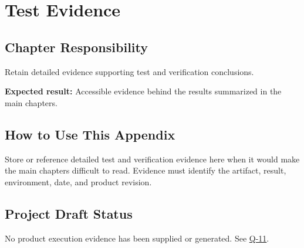 \chapter{Test Evidence}
\section{Chapter Responsibility}
\label{Section:TestEvidenceResponsibility}
Retain detailed evidence supporting test and verification conclusions.

\noindent\textbf{Expected result:} Accessible evidence behind the results summarized in the main chapters.

\section{How to Use This Appendix}
Store or reference detailed test and verification evidence here when it would make the main chapters difficult to read. Evidence must identify the artifact, result, environment, date, and product revision.
\section{Project Draft Status}
No product execution evidence has been supplied or generated. See \hyperref[Question:Q-11]{Q-11}.
